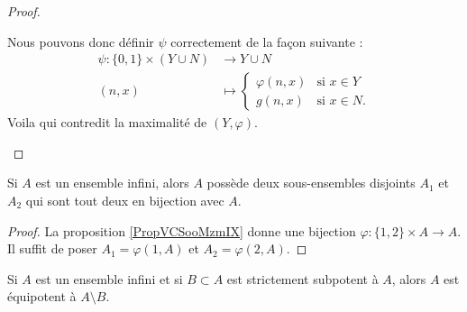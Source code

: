 \begin{proof}
\begin{subproof}
\begin{subproof}
                    Nous pouvons donc définir \( \psi\) correctement de la façon suivante :
                    \begin{equation}
                        \begin{aligned}
                            \psi\colon \{ 0,1 \}\times (Y\cup N)&\to Y\cup N \\
                            (n,x)&\mapsto \begin{cases}
                                \varphi(n,x)    &   \text{si } x\in Y\\
                                g(n,x)    &    \text{si }x\in N.
                            \end{cases}
                        \end{aligned}
                    \end{equation}
                    Voila qui contredit la maximalité de \( (Y,\varphi)\).
            \end{subproof}
    \end{subproof}
\end{proof}

\begin{corollary}       \label{CORooJCSIooOeOICJ}
    Si \( A\) est un ensemble infini, alors \( A\) possède deux sous-ensembles disjoints \( A_1\) et \( A_2\) qui sont tout deux en bijection avec \( A\).
\end{corollary}

\begin{proof}
    La proposition \ref{PropVCSooMzmIX} donne une bijection \( \varphi\colon \{ 1,2 \}\times A\to A\). Il suffit de poser \( A_1=\varphi(1,A)\) et \( A_2=\varphi(2,A)\).
\end{proof}

\begin{lemma}       \label{LEMooIVCBooHWQiZB}
    Si \( A\) est un ensemble infini et si \( B\subset A\) est strictement subpotent à \( A\), alors \( A\) est équipotent à \( A\setminus B\).
\end{lemma}

